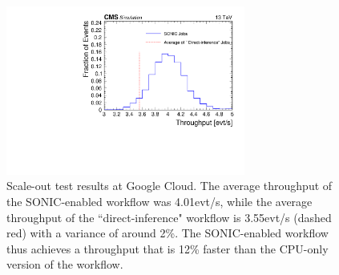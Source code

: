 \begin{figure}[htp]
    \centering
    \includegraphics[width=0.70\textwidth]{plots/scale_out_test_reformat.pdf}
    \caption{Scale-out test results at Google Cloud. The average throughput of the SONIC-enabled workflow was 4.01\unit{evt/s}, while the average throughput of the ``direct-inference" workflow is 3.55\unit{evt/s} (dashed red) with a variance of around 2\%. The SONIC-enabled workflow thus achieves a throughput that is 12\% faster than the CPU-only version of the workflow.}
    \label{fig:scaleout}
\end{figure}

